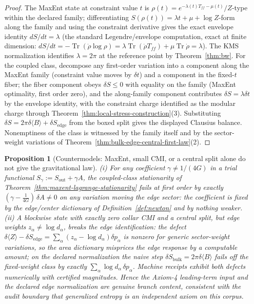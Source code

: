 \documentclass[11pt]{article}
\newtheorem{proposition}[theorem]{Proposition}
\begin{document}
\begin{proof}
The MaxEnt state at constraint value \(t\) is
\(\rho(t)=e^{-\lambda(t)T_{ff}-\mu(t)}/Z\)-type within the declared family;
differentiating \(S(\rho(t))=\lambda t+\mu+\log Z\)-form along the family and
using the constraint derivative gives the exact envelope identity
\(dS/dt=\lambda\) (the standard Legendre/envelope computation, exact at
finite dimension: \(dS/dt=-\operatorname{Tr}(\dot\rho\log\rho)
=\lambda\operatorname{Tr}(\dot\rho T_{ff})+\mu\operatorname{Tr}\dot\rho
=\lambda\)). The KMS normalization identifies \(\lambda=2\pi\) at the
reference point by Theorem~\ref{thm:bw}. For the coupled class, decompose any
first-order variation into a component along the MaxEnt family (constraint
value moves by \(\delta t\)) and a component in the fixed-\(t\) fiber;
the fiber component obeys \(\delta S\leq0\) with equality on the family
(MaxEnt optimality, first order zero), and the along-family component
contributes \(\delta S=\lambda\delta t\) by the envelope identity, with the
constraint charge identified as the modular charge through
Theorem~\ref{thm:local-stress-construction}(3). Substituting
\(\delta S=2\pi\delta\langle B\rangle+\delta S_{\mathrm{edge}}\) from the
boxed split gives the displayed Clausius balance. Nonemptiness of the class is
witnessed by the family itself and by the sector-weight variations of
Theorem~\ref{thm:bulk-edge-central-first-law}(2).
\end{proof}

\begin{proposition}[Countermodels: MaxEnt, small CMI, or a central split alone do not give the gravitational law]
\label{prop:entropy-coefficient-countermodel}
(i) For any coefficient \(\gamma\neq1/(4G)\) in a trial functional
\(S_\gamma:=S_{\mathrm{out}}+\gamma A\), the coupled-class stationarity of
Theorem~\ref{thm:maxent-lagrange-stationarity} fails at first order by
exactly \((\gamma-\tfrac1{4G})\,\delta A\neq0\) on any variation moving the
edge sector: the coefficient is fixed by the edge/center dictionary of
Definition~\ref{def:newton} and by nothing weaker. (ii) A blockwise state
with exactly zero collar CMI and a central split, but edge weights
\(z_\alpha\neq\log d_\alpha\), breaks the edge identification: the defect
\(\delta\langle Z\rangle-\delta S_{\mathrm{edge}}
=\sum_\alpha(z_\alpha-\log d_\alpha)\delta p_\alpha\)
is nonzero for generic sector-weight variations, so the area dictionary
misprices the edge response by a computable amount; on the declared
normalization the naive step
\(\delta S_{\mathrm{bulk}}=2\pi\delta\langle B\rangle\) fails off the
fixed-weight class by exactly \(\sum_\alpha\log d_\alpha\,\delta p_\alpha\). Machine receipts exhibit both defects
numerically with certified magnitudes. Hence the
Axiom-4 leading-term input and the declared edge normalization are genuine
branch content, consistent with the audit boundary that generalized entropy
is an independent axiom on this corpus.
\end{proposition}
\end{document}
